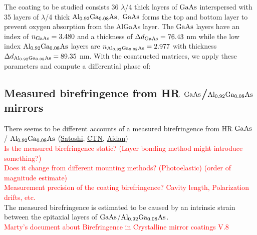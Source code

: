 The coating to be studied consists 36 $\lambda$/4  thick layers of $\mathrm{GaAs}$ interspersed with 35 layers of $\lambda$/4 thick $\mathrm{Al_{0.92}Ga_{0.08}As}$.   $\mathrm{GaAs}$ forms the top and bottom layer to prevent oxygen absorption from the AlGaAs layer. The $\mathrm{GaAs}$ layers have an index of $n_{\mathrm{GaAs}} = 3.480$ and a thickness of $\Delta d_{\mathrm{GaAs}} = 76.43$ nm while the low index $\mathrm{Al_{0.92}Ga_{0.08}As}$ layers are $n_{\mathrm{Al_{0.92}Ga_{0.08}As}} = 2.977$ with thickness $\Delta d_{\mathrm{Al_{0.92}Ga_{0.08}As}} = 89.35$ nm. With the cosntructed matrices, we apply these parameters and compute a differential phase of:



\subsection{Measured birefringence from HR $\mathrm{GaAs}$/$\mathrm{Al_{0.92}Ga_{0.08}As}$ mirrors}
There seems to be different accounts of a measured birefringence from HR $\mathrm{GaAs}$ / $\mathrm{Al_{0.92}Ga_{0.08}As}$ (\href{https://dcc.ligo.org/DocDB/0181/G2200386/001/G2200386.pdf}{Satoshi}, \href{https://nodus.ligo.caltech.edu:8081/CTN/1474}{CTN}, \href{https://dcc.ligo.org/DocDB/0181/G2200559/001/G2200559-v1%20-%20polarization.pdf}{Aidan})
\\
\textcolor{red}{Is the measured birefringence static? (Layer bonding method might introduce something?)}
\\
\textcolor{red}{Does it change from different mounting methods? (Photoelastic) (order of magnitude estimate)}
\\
\textcolor{red}{Measurement precision of the coating birefringence? Cavity length, Polarization drifts, etc.}
\\
The measured birefringence is estimated to be caused by an intrinsic strain between the epitaxial layers of $\mathrm{GaAs}$/$\mathrm{Al_{0.92}Ga_{0.08}As}$. \cite{Cole:2013}
\\
\textcolor{red}{Marty's document about Birefringence in Crystalline mirror coatings V.8}


